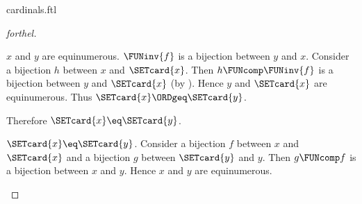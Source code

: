 \documentclass{stex}
\begin{document}
\begin{smodule}{cardinals.ftl}
\begin{proof}[forthel]
\begin{case}{$x$ and $y$ are equinumerous.}
    $\FUNinv{f}$ is a bijection between $y$ and $x$.
    Consider a bijection $h$ between $x$ and $\SETcard{x}$.
    Then $h \FUNcomp \FUNinv{f}$ is a bijection between $y$ and $\SETcard{x}$ (by ).
    Hence $y$ and $\SETcard{x}$ are equinumerous.
    Thus $\SETcard{x} \ORDgeq \SETcard{y}$.

    Therefore $\SETcard{x} \eq \SETcard{y}$.
  \end{case}

  \begin{case}{$\SETcard{x} \eq \SETcard{y}$.}
    Consider a bijection $f$ between $x$ and $\SETcard{x}$ and a bijection $g$
    between $\SETcard{y}$ and $y$.
    Then $g \FUNcomp f$ is a bijection between $x$ and $y$.
    Hence $x$ and $y$ are equinumerous.
  \end{case}
\end{proof}
\end{smodule}
\end{document}
